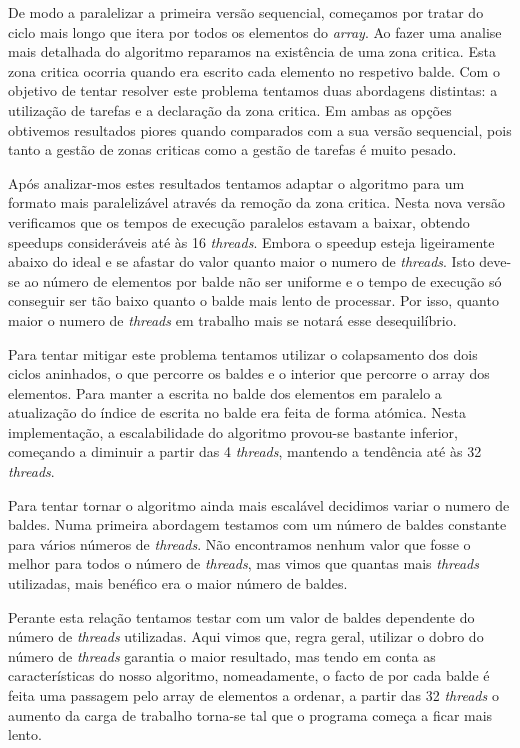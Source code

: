 \documentclass[a4paper]{report}
\begin{document}
De modo a paralelizar a primeira versão sequencial, começamos por tratar do
ciclo mais longo que itera por todos os elementos do \textit{array}. Ao fazer
uma analise mais detalhada do algoritmo reparamos na existência de uma zona
critica. Esta zona critica ocorria quando era escrito cada elemento no respetivo
balde. Com o objetivo de tentar resolver este problema tentamos duas abordagens
distintas: a utilização de tarefas e a declaração da zona critica. Em ambas as
opções obtivemos resultados piores quando comparados com a sua versão
sequencial, pois tanto a gestão de zonas criticas como a gestão de tarefas é
muito pesado.

Após analizar-mos estes resultados tentamos adaptar o algoritmo para um formato
mais paralelizável através da remoção da zona critica. Nesta nova versão
verificamos que os tempos de execução paralelos estavam a baixar, obtendo
speedups consideráveis até às 16 \textit{threads}. Embora o speedup esteja
ligeiramente abaixo do ideal e se afastar do valor quanto maior o numero de
\textit{threads}. Isto deve-se ao número de elementos por balde não ser uniforme
e o tempo de execução só conseguir ser tão baixo quanto o balde mais lento de
processar. Por isso, quanto maior o numero de \textit{threads} em trabalho mais
se notará esse desequilíbrio.

Para tentar mitigar este problema tentamos utilizar o colapsamento dos dois
ciclos aninhados, o que percorre os baldes e o interior que percorre o array dos
elementos. Para manter a escrita no balde dos elementos em paralelo a
atualização do índice de escrita no balde era feita de forma atómica. Nesta
implementação, a escalabilidade do algoritmo provou-se bastante inferior,
começando a diminuir a partir das 4 \textit{threads}, mantendo a tendência até
às 32 \textit{threads}.

Para tentar tornar o algoritmo ainda mais escalável decidimos variar o numero
de baldes. Numa primeira abordagem testamos com um número de baldes constante
para vários números de \textit{threads}. Não encontramos nenhum valor que fosse
o melhor para todos o número de \textit{threads}, mas vimos que quantas mais
\textit{threads} utilizadas, mais benéfico era o maior número de baldes. 

Perante esta relação tentamos testar com um valor de baldes dependente do número
de \textit{threads} utilizadas. Aqui vimos que, regra geral, utilizar o dobro do
número de \textit{threads} garantia o maior resultado, mas tendo em conta as
características do nosso algoritmo, nomeadamente, o facto de por cada balde é
feita uma passagem pelo array de elementos a ordenar, a partir das 32
\textit{threads} o aumento da carga de trabalho torna-se tal que o programa
começa a ficar mais lento.
\end{document}
